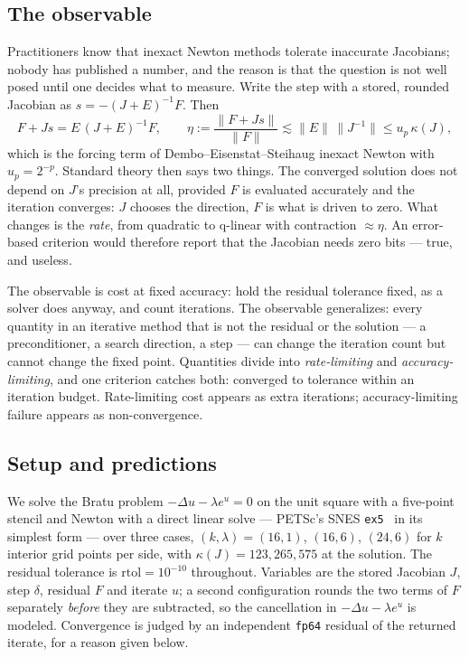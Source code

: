 \documentclass[11pt]{article}
\begin{document}
\subsection{The observable}
\label{sec:observable}

Practitioners know that inexact Newton methods tolerate inaccurate Jacobians;
nobody has published a number, and the reason is that the question is not well
posed until one decides what to measure. Write the step with a stored, rounded
Jacobian as $s = -(J+E)^{-1}F$. Then
\[
  F + Js = E\,(J+E)^{-1}F, \qquad
  \eta := \frac{\lVert F + Js\rVert}{\lVert F\rVert} \lesssim \lVert E\rVert\,\lVert J^{-1}\rVert \le u_p\,\kappa(J),
\]
which is the forcing term of Dembo--Eisenstat--Steihaug inexact Newton with
$u_p = 2^{-p}$. Standard theory then says two things. The converged solution does
not depend on $J$'s precision at all, provided $F$ is evaluated accurately and the
iteration converges: $J$ chooses the direction, $F$ is what is driven to zero.
What changes is the \emph{rate}, from quadratic to q-linear with contraction
$\approx \eta$. An error-based criterion would therefore report that the Jacobian
needs zero bits --- true, and useless.

The observable is cost at fixed accuracy: hold the residual tolerance fixed, as a
solver does anyway, and count iterations. The observable generalizes: every
quantity in an iterative method that is not the residual or the solution --- a
preconditioner, a search direction, a step --- can change the iteration count
but cannot change the fixed point. Quantities divide into \emph{rate-limiting}
and \emph{accuracy-limiting},
and one criterion catches both: converged to tolerance within an iteration
budget. Rate-limiting cost appears as extra iterations; accuracy-limiting failure
appears as non-convergence.

\subsection{Setup and predictions}

We solve the Bratu problem $-\Delta u - \lambda e^u = 0$ on the unit square with
a five-point stencil and Newton with a direct linear solve --- PETSc's SNES
\texttt{ex5}~\cite{petsc} in its simplest form --- over three cases, $(k,\lambda)
= (16,1)$, $(16,6)$, $(24,6)$ for $k$ interior grid points per side, with
$\kappa(J) = 123, 265, 575$ at the solution. The residual tolerance is
$\mathrm{rtol} = 10^{-10}$ throughout. Variables are the stored Jacobian
$J$, step $\delta$, residual $F$ and iterate $u$; a second configuration rounds
the two terms of $F$ separately \emph{before} they are subtracted, so the
cancellation in $-\Delta u - \lambda e^u$ is modeled. Convergence is judged by an
independent \texttt{fp64} residual of the returned iterate, for a reason given
below.
\end{document}
